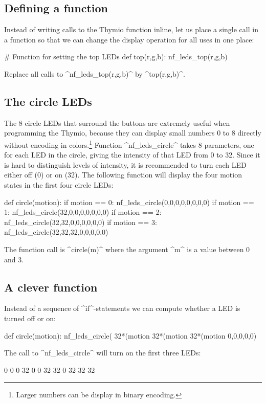 \documentclass[11pt,a4paper]{article}
\begin{document}
\subsection*{Defining a function}

Instead of writing calls to the Thymio function inline, let us place a single call in a function so that we can change the display operation for all uses in one place:
\begin{prog}
# Function for setting the top LEDs
def top(r,g,b):
    nf_leds_top(r,g,b)
\end{prog}
Replace all calls to ^nf_leds_top(r,g,b)^ by ^top(r,g,b)^.

\subsection*{The circle LEDs}

The 8 circle LEDs that surround the buttons are extremely useful when programming the Thymio, because they can display small numbers 0 to 8 directly without encoding in colors.\footnote{Larger numbers can be display in binary encoding.} Function ^nf_leds_circle^ takes 8 parameters, one for each LED in the circle, giving the intensity of that LED from 0 to 32. Since it is hard to distinguish levels of intensity, it is recommended to turn each LED either off (0) or on (32). The following function will display the four motion states in the first four circle LEDs:
\newpage

\begin{prog}
def circle(motion):
    if motion == 0: nf_leds_circle(0,0,0,0,0,0,0,0)
    if motion == 1: nf_leds_circle(32,0,0,0,0,0,0,0)
    if motion == 2: nf_leds_circle(32,32,0,0,0,0,0,0)
    if motion == 3: nf_leds_circle(32,32,32,0,0,0,0,0)
\end{prog}
The function call is ^circle(m)^ where the argument ^m^ is a value between 0 and 3.

\subsection*{A clever function}

Instead of a sequence of ^if^-statements we can compute whether a LED is turned off or on:
\begin{prog}
def circle(motion):
    nf_leds_circle(
        32*(motion %
        32*(motion %
        32*(motion %
        0,0,0,0,0)
\end{prog}
The call to ^nf_leds_circle^ will turn on the first three LEDs:
\begin{prog}
0 0 0
32 0 0
32 32 0
32 32 32
\end{prog}
\end{document}
